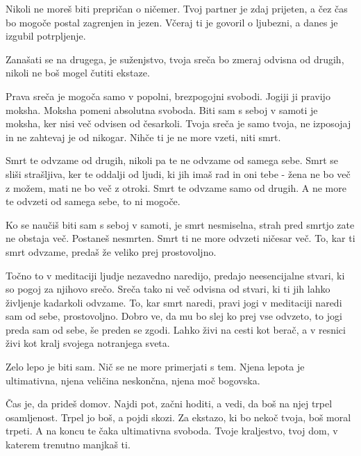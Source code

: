 Nikoli ne moreš biti prepričan o ničemer. Tvoj partner je zdaj prijeten, a čez čas bo mogoče postal zagrenjen in jezen. Včeraj ti je govoril o ljubezni, a danes je izgubil potrpljenje. 

Zanašati se na drugega, je suženjstvo, tvoja sreča bo zmeraj odvisna od drugih, nikoli ne boš mogel čutiti ekstaze. 

Prava sreča je mogoča samo v popolni, brezpogojni svobodi. Jogiji ji pravijo moksha. Moksha pomeni absolutna svoboda. Biti sam s seboj v samoti je moksha, ker nisi več odvisen od česarkoli. Tvoja sreča je samo tvoja, ne izposojaj in ne zahtevaj je od nikogar. Nihče ti je ne more vzeti, niti smrt. 

Smrt te odvzame od drugih, nikoli pa te ne odvzame od samega sebe. Smrt se sliši strašljiva, ker te oddalji od ljudi, ki jih imaš rad in oni tebe - žena ne bo več z možem, mati ne bo več z otroki. Smrt te odvzame samo od drugih. A ne more te odvzeti od samega sebe, to ni mogoče. 

Ko se naučiš biti sam s seboj v samoti, je smrt nesmiselna, strah pred smrtjo zate ne obstaja več. Postaneš nesmrten. Smrt ti ne more odvzeti ničesar več. To, kar ti smrt odvzame, predaš že veliko prej prostovoljno. 

Točno to v meditaciji ljudje nezavedno naredijo, predajo neesencijalne stvari, ki so pogoj za njihovo srečo. Sreča tako ni več odvisna od stvari, ki ti jih lahko življenje kadarkoli odvzame. To, kar smrt naredi, pravi jogi v meditaciji naredi sam od sebe, prostovoljno. Dobro ve, da mu bo slej ko prej vse odvzeto, to jogi preda sam od sebe, še preden se zgodi. Lahko živi na cesti kot berač, a v resnici živi kot kralj svojega notranjega sveta. 

Zelo lepo je biti sam. Nič se ne more primerjati s tem. Njena lepota je ultimativna, njena veličina neskončna, njena moč bogovska. 

Čas je, da prideš domov. Najdi pot, začni hoditi, a vedi, da boš na njej trpel osamljenost. Trpel jo boš, a pojdi skozi. Za ekstazo, ki bo nekoč tvoja, boš moral trpeti. A na koncu te čaka ultimativna svoboda. Tvoje kraljestvo, tvoj dom, v katerem trenutno manjkaš ti. 